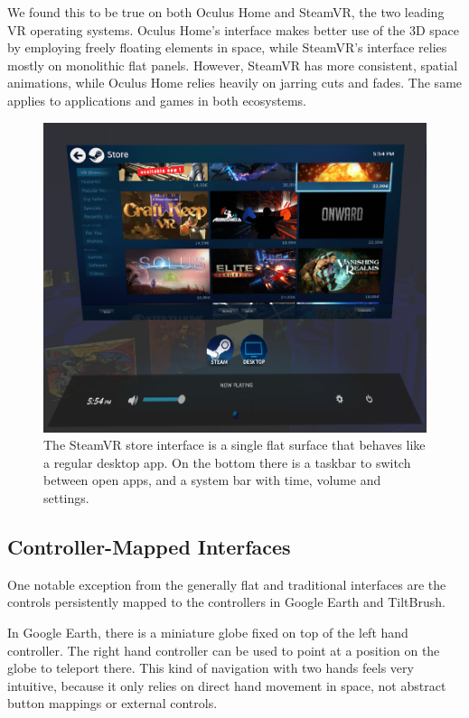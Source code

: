 \documentclass{tufte-book} %
\begin{document}
We found this to be true on both Oculus Home and SteamVR, the two leading VR operating systems. Oculus Home's interface makes better use of the 3D space by employing freely floating elements in space, while SteamVR's interface relies mostly on monolithic flat panels. However, SteamVR has more consistent, spatial animations, while Oculus Home relies heavily on jarring cuts and fades. The same applies to applications and games in both ecosystems.

\begin{figure}
  \includegraphics{steamstore.png}
  \caption{The SteamVR store interface is a single flat surface that behaves like a regular desktop app. On the bottom there is a taskbar to switch between open apps, and a system bar with time, volume and settings.}
  \label{fig:steamstore}
\end{figure}


\subsection{Controller-Mapped Interfaces}
One notable exception from the generally flat and traditional interfaces are the controls persistently mapped to the controllers in Google Earth and TiltBrush.

In Google Earth, there is a miniature globe fixed on top of the left hand controller. The right hand controller can be used to point at a position on the globe to teleport there. This kind of navigation with two hands feels very intuitive, because it only relies on direct hand movement in space, not abstract button mappings or external controls.
\end{document}

